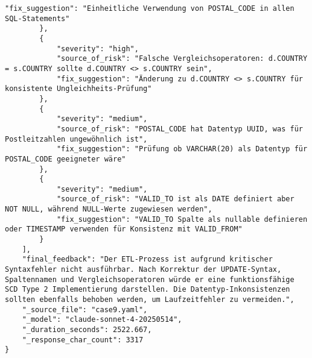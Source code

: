 \begin{lstlisting}[caption={Ausgabe: Claude Sonnet 4 Anwendungsfall 9 Robustheitsdurchlauf},label={claude_case9_prompt3}]
            "fix_suggestion": "Einheitliche Verwendung von POSTAL_CODE in allen SQL-Statements"
        },
        {
            "severity": "high",
            "source_of_risk": "Falsche Vergleichsoperatoren: d.COUNTRY = s.COUNTRY sollte d.COUNTRY <> s.COUNTRY sein",
            "fix_suggestion": "Änderung zu d.COUNTRY <> s.COUNTRY für konsistente Ungleichheits-Prüfung"
        },
        {
            "severity": "medium",
            "source_of_risk": "POSTAL_CODE hat Datentyp UUID, was für Postleitzahlen ungewöhnlich ist",
            "fix_suggestion": "Prüfung ob VARCHAR(20) als Datentyp für POSTAL_CODE geeigneter wäre"
        },
        {
            "severity": "medium",
            "source_of_risk": "VALID_TO ist als DATE definiert aber NOT NULL, während NULL-Werte zugewiesen werden",
            "fix_suggestion": "VALID_TO Spalte als nullable definieren oder TIMESTAMP verwenden für Konsistenz mit VALID_FROM"
        }
    ],
    "final_feedback": "Der ETL-Prozess ist aufgrund kritischer Syntaxfehler nicht ausführbar. Nach Korrektur der UPDATE-Syntax, Spaltennamen und Vergleichsoperatoren würde er eine funktionsfähige SCD Type 2 Implementierung darstellen. Die Datentyp-Inkonsistenzen sollten ebenfalls behoben werden, um Laufzeitfehler zu vermeiden.",
    "_source_file": "case9.yaml",
    "_model": "claude-sonnet-4-20250514",
    "_duration_seconds": 2522.667,
    "_response_char_count": 3317
}
\end{lstlisting}

